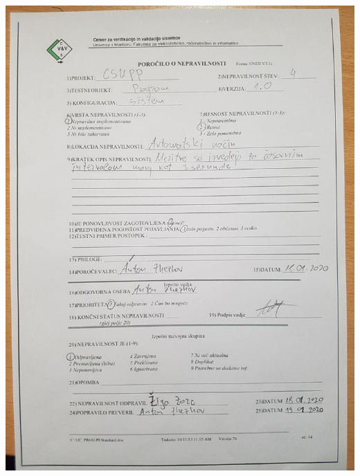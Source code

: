 \documentclass[a4paper,12pt]{article}
\begin{document}
{	\includegraphics[width=15cm]{porocila/04.jpg}
	
\newpage
	
	\hspace{2cm}

	\vspace{2cm}
	
}
\end{document}

